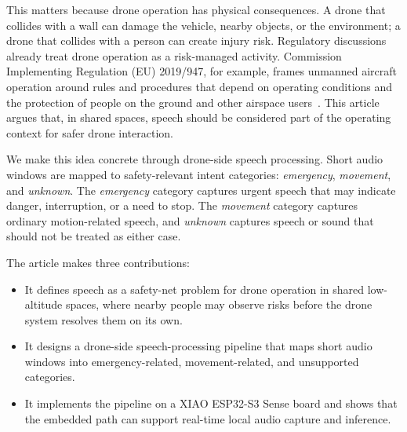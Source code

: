 This matters because drone operation has physical consequences. A drone that collides with a wall can damage the vehicle, nearby objects, or the environment; a drone that collides with a person can create injury risk. Regulatory discussions already treat drone operation as a risk-managed activity. Commission Implementing Regulation (EU) 2019/947, for example, frames unmanned aircraft operation around rules and procedures that depend on operating conditions and the protection of people on the ground and other airspace users~\cite{eu2019uasops}. This article argues that, in shared spaces, speech should be considered part of the operating context for safer drone interaction.

We make this idea concrete through drone-side speech processing. Short audio windows are mapped to safety-relevant intent categories: \emph{emergency}, \emph{movement}, and \emph{unknown}. The \emph{emergency} category captures urgent speech that may indicate danger, interruption, or a need to stop. The \emph{movement} category captures ordinary motion-related speech, and \emph{unknown} captures speech or sound that should not be treated as either case.

The article makes three contributions:
\begin{itemize}
    \item It defines speech as a safety-net problem for drone operation in shared low-altitude spaces, where nearby people may observe risks before the drone system resolves them on its own.
    \item It designs a drone-side speech-processing pipeline that maps short audio windows into emergency-related, movement-related, and unsupported categories.
    \item It implements the pipeline on a XIAO ESP32-S3 Sense board and shows that the embedded path can support real-time local audio capture and inference.
\end{itemize}



